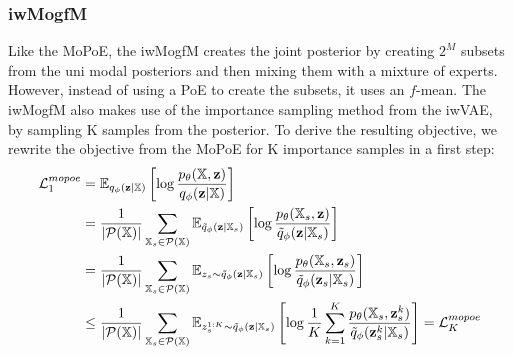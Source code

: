 \begin{figure}
    \centering
\end{figure}

\subsubsection{iwMogfM}
Like the MoPoE, the iwMogfM creates the joint posterior by creating $2^M$ subsets from the uni modal posteriors and then mixing them with a mixture of experts.
However, instead of using a PoE to create the subsets, it uses an $f$-mean.
The iwMogfM also makes use of the importance sampling method from the iwVAE, by sampling K samples from the posterior.
To derive the resulting objective, we rewrite the objective from the MoPoE for K importance samples in a first step:
\begin{equation}
    \begin{split}
        \mathcal{L}^{mopoe}_1 &= \mathbb{E}_{q_{\phi}(\textbf{z}|\mathbb{X})} \left[ \log \frac{p_{\theta}(\mathbb{X}, \textbf{z})}{q_{\phi}(\textbf{z}|\mathbb{X})} \right]\\
        &=\frac{1}{|\mathcal{P}(\mathbb{X})|} \sum _{\mathbb{X}_s \in \mathcal{P}(\mathbb{X})} \mathbb{E}_{\tilde{q}_{\phi}(\textbf{z}|\mathbb{X}_s)} \left[ \log \frac{p_{\theta}(\mathbb{X}_s, \textbf{z})}{\tilde{q}_{\phi}(\textbf{z}|\mathbb{X}_s)} \right]\\
        &=\frac{1}{|\mathcal{P}(\mathbb{X})|} \sum _{\mathbb{X}_s \in \mathcal{P}(\mathbb{X})} \mathbb{E}_{z_s \sim \tilde{q}_{\phi}(\textbf{z}|\mathbb{X}_s)} \left[ \log \frac{p_{\theta}(\mathbb{X}_s, \textbf{z}_s)}{\tilde{q}_{\phi}(\textbf{z}_s|\mathbb{X}_s)} \right]\\
        &\leq \frac{1}{|\mathcal{P}(\mathbb{X})|} \sum _{\mathbb{X}_s \in \mathcal{P}(\mathbb{X})} \mathbb{E}_{z^{1:K}_s \sim \tilde{q}_{\phi}(\textbf{z}|\mathbb{X}_s)} \left[ \log \frac{1}{K} \sum _{k=1}^K \frac{p_{\theta}(\mathbb{X}_s, \textbf{z}^k _s)}{\tilde{q}_{\phi}(\textbf{z}^k _s|\mathbb{X}_s)} \right] = \mathcal{L}^{mopoe}_K
    \end{split}
\end{equation}

